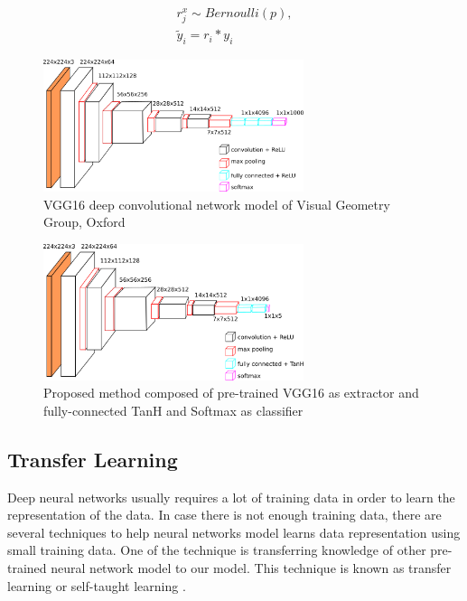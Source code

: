 \documentclass[conference, compsoc]{IEEEtran}
\begin{document}
\begin{align}
r_{j}^{x} \sim Bernoulli(p), \nonumber \\
\tilde{y} _{i}= r _{i} * y _{i}
\label{eq_dropout}
\end{align}


\begin{figure}[h]
	\begin{center}
		\includegraphics[width=3.0in]{../vgg16}
		\renewcommand{\figurename}{Fig.}		
		\caption{VGG16 deep convolutional network model of Visual Geometry Group, Oxford}
		\label{fig_vgg16}
	\end{center}
\end{figure}

\begin{figure}[h]
	\begin{center}
		\includegraphics[width=3.0in]{../proposed_method}
		\renewcommand{\figurename}{Fig.}		
		\caption{Proposed method composed of pre-trained VGG16 as extractor and fully-connected TanH and Softmax as classifier}
		\label{fig_proposed_method}
	\end{center}
\end{figure}

\subsection{Transfer Learning}

Deep neural networks usually requires a lot of training data in order to learn the representation of the data. In case there is not enough training data, there are several techniques to help neural networks model learns data representation using small training data. One of the technique is transferring knowledge of other pre-trained neural network model to our model. This technique is known as transfer learning or self-taught learning \cite{raina2007self}.
\end{document}
